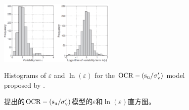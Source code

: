 \begin{figure}[!htb]
    \centering
    \includegraphics[width=0.5\textwidth]{figures/figure-17.png}
    \caption{Histograms of $\varepsilon$ and $\ln(\varepsilon)$ for the $\rm{OCR}-(s_u/\sigma_v')$ model proposed by \citet{Jamiolkowski198557}.}
    \addtocounter{figure}{-1}
    \vspace{-5pt}
    \renewcommand{\figurename}{图}
    \caption{\citet{Jamiolkowski198557}提出的$\rm{OCR}-(s_u/\sigma_v')$模型的$\varepsilon$和$\ln(\varepsilon)$直方图。}
    \renewcommand{\figurename}{Figure}
    \label{figure:17}
\end{figure}